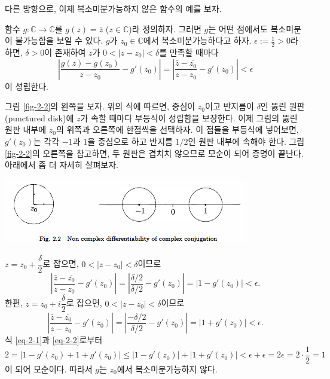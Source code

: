 다른 방향으로, 이제 복소미분가능하지 않은 함수의 예를 보자.

\begin{saltexample}{}{} \label{example-2-2}
함수 $g:\mathbb C \to \mathbb C$를 $g(z) = \bar z$ ($z\in\mathbb C$)라 정의하자.
그러면 $g$는 어떤 점에서도 복소미분이 불가능함을 보일 수 있다.
$g$가 $z_0\in\mathbb C$에서 복소미분가능하다고 하자.
$\epsilon:=\frac12 >0$라 하면, $\delta>0$이 존재하여
$z$가 $0<|z-z_0|<\delta$를 만족할 때마다 
\[
\left| \dfrac{g(z)-g(z_0)}{z-z_0} - g'(z_0) \right| 
= \left| \dfrac{\bar z - \overline{z_0}}{z-z_0} - g'(z_0) \right| 
<\epsilon
\]
이 성립한다.

그림 \ref{fig-2-2}의 왼쪽을 보자.
위의 식에 따르면,
중심이 $z_0$이고 반지름이 $\delta$인 뚫린 원판(punctured disk)에 $z$가 속할 때마다
부등식이 성립함을 보장한다.
이제 그림의 뚫린 원판 내부에 $z_0$의 위쪽과 오른쪽에 한점씩을 선택하자.
이 점들을 부등식에 넣어보면, $g'(z_0)$는 각각 $-1$과 $1$을 중심으로 하고 반지름 $1/2$인
원판 내부에 속해야 한다.
그림 \ref{fig-2-2}의 오른쪽을 참고하면, 두 원판은 겹치치 않으므로 모순이 되어 증명이 끝난다.
아래에서 좀 더 자세히 살펴보자.

\begin{center}
\includegraphics[width=0.8\textwidth]{./SaltChapter/fig-2-2}
\end{center}
\label{fig-2-2}

$z=z_0+ \dfrac\delta2$로 잡으면, $0<|z-z_0|<\delta$이므로
\begin{equation} \label{eq-2-1}
\left| \dfrac{\bar z - \overline{z_0}}{z-z_0} - g'(z_0) \right| 
= \left| \dfrac{\delta/2}{\delta/2} - g'(z_0) \right| 
= | 1 - g'(z_0)| < \epsilon.
\end{equation}
한편, $z=z_0+ i\dfrac\delta2$로 잡으면, $0<|z-z_0|<\delta$이므로
\begin{equation} \label{eq-2-2}
\left| \dfrac{\bar z - \overline{z_0}}{z-z_0} - g'(z_0) \right| 
= \left| \dfrac{-\delta/2}{\delta/2} - g'(z_0) \right| 
= | 1 + g'(z_0)| < \epsilon.
\end{equation}
식 \eqref{eq-2-1}과 \eqref{eq-2-2}로부터
\[
2 = | 1- g'(z_0) + 1+ g'(z_0)|
\le |1-g'(z_0)| + |1+g'(z_0)| < \epsilon + \epsilon 
= 2\epsilon = 2\cdot\dfrac12 = 1
\]
이 되어 모순이다.
따라서 $g$는 $z_0$에서 복소미분가능하지 않다.
\end{saltexample}

